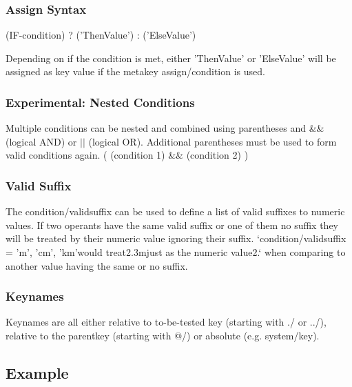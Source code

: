 \subsubsection*{Assign Syntax}

\begin{DoxyVerb}(IF-condition) ? ('ThenValue') : ('ElseValue')
\end{DoxyVerb}


Depending on if the condition is met, either 'Then\+Value' or 'Else\+Value' will be assigned as key value if the metakey {\ttfamily assign/condition} is used.

\subsubsection*{Experimental\+: Nested Conditions}

Multiple conditions can be nested and combined using parentheses and {\ttfamily \&\&} (logical A\+N\+D) or {\ttfamily $\vert$$\vert$} (logical O\+R). Additional parentheses must be used to form valid conditions again. {\ttfamily (} {\ttfamily (condition 1) \&\& (condition 2)} {\ttfamily )}

\subsubsection*{Valid Suffix}

The {\ttfamily condition/validsuffix} can be used to define a list of valid suffixes to numeric values. If two operants have the same valid suffix or one of them no suffix they will be treated by their numeric value ignoring their suffix. `condition/validsuffix = 'm', 'cm', 'km'{\ttfamily would treat}2.\+3m{\ttfamily just as the numeric value}2.` when comparing to another value having the same or no suffix.

\subsubsection*{Keynames}

Keynames are all either relative to to-\/be-\/tested key (starting with {\ttfamily ./} or {\ttfamily ../}), relative to the parentkey (starting with {\ttfamily @/}) or absolute (e.\+g. {\ttfamily system/key}).

\subsection*{Example}

